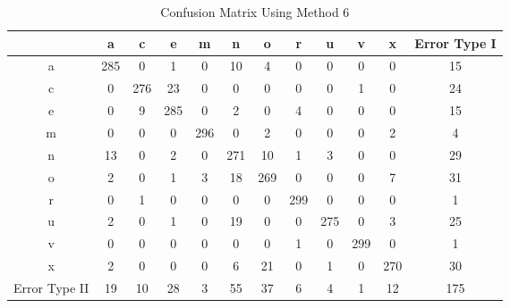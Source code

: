 \documentclass[12pt]{article}
\begin{document}
\begin{table}[!ht]
    \centering
    \caption{Confusion Matrix Using Method 6}
    \begin{tabular}{| c | c | c | c | c | c | c | c | c | c | c | c |} \hline
        & a & c & e & m & n & o & r & u & v & x & Error Type I\\ \hline
      a & 285 & 0 & 1 & 0 & 10 & 4 & 0 & 0 & 0 & 0 & 15\\ \hline
      c & 0 & 276 & 23 & 0 & 0 & 0 & 0 & 0 & 1 & 0 & 24\\ \hline
      e & 0 & 9 & 285 & 0 & 2 & 0 & 4 & 0 & 0 & 0 & 15\\ \hline
      m & 0 & 0 & 0 & 296 & 0 & 2 & 0 & 0 & 0 & 2 & 4\\ \hline
      n & 13 & 0 & 2 & 0 & 271 & 10 & 1 & 3 & 0 & 0 & 29\\ \hline
      o & 2 & 0 & 1 & 3 & 18 & 269 & 0 & 0 & 0 & 7 & 31\\ \hline
      r & 0 & 1 & 0 & 0 & 0 & 0 & 299 & 0 & 0 & 0 & 1\\ \hline
      u & 2 & 0 & 1 & 0 & 19 & 0 & 0 & 275 & 0 & 3 & 25\\ \hline
      v & 0 & 0 & 0 & 0 & 0 & 0 & 1 & 0 & 299 & 0 & 1\\ \hline
      x & 2 & 0 & 0 & 0 & 6 & 21 & 0 & 1 & 0 & 270 & 30\\ \hline
Error Type II & 19 & 10 & 28 & 3 & 55 & 37 & 6 & 4 & 1 & 12 & 175\\ \hline
    \end{tabular}
    \label{tab:nn}
\end{table}

\newpage



\end{document}

